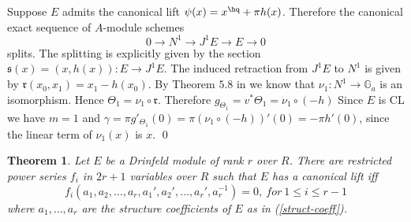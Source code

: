 \documentclass{amsart}
\newtheorem {theorem} {\bf{Theorem}}[section]
\numberwithin {equation}{section}
\begin{document}
\proof Suppose $E$ admits the canonical lift $\psi(x)=x^{\hq}+\pi h(x)$.   
Therefore the canonical exact sequence of $A$-module schemes  
$$0\longrightarrow N^{1}\longrightarrow J^{1}E\longrightarrow E\longrightarrow 0$$
splits. The splitting is explicitly given by the section $\mathfrak{s}(x)=(x,h(x)):E\longrightarrow J^{1}E$. The induced retraction from $J^{1}E$ to $N^{1}$ is given by $\mathfrak{r}(x_{0},x_{1})=x_{1}-h(x_{0})$. By Theorem $5.8$ in \cite{BS b} we know that $\nu_{1}:N^{1}\longrightarrow\hat{\mathbb{G}}_{a}$ is an isomorphism.
Hence $\Theta_{1}=\nu_{1}\circ \mathfrak{r}$. Therefore $g_{\Theta_{1}}=v^{*}\Theta_{1}=\nu_{1}\circ(-h)$
Since $E$ is CL we have $m=1$ and $\gamma=\pi g'_{\Theta_{1}}(0)=\pi\left(\nu_{1}\circ(-h)\right)'(0)=-\pi h'(0)$, since the linear term of $\nu_{1}(x)$ is $x$.
\qed



\begin{theorem}
Let $E$ be a Drinfeld module of rank $r$ over $R$. There are restricted power series $f_{i}$ in $2r+1$  variables over $R$ such that $E$ has a canonical lift iff    $$ f_{i}(a_{1},a_{2},\ldots ,a_{r},a_{1}',a_{2}',\ldots ,a_{r}',a_{r}^{-1})=0,\ for\ 1\leq i\leq r-1$$ 
where $a_1,\dots, a_r$ are the structure coefficients of $E$ as in 
(\ref{struct-coeff}).
\end{theorem}
\end{document}

